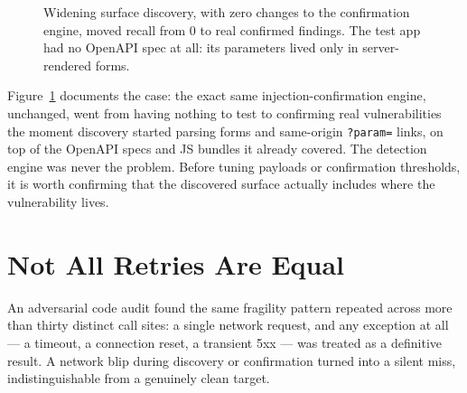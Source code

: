 \documentclass[10pt]{article}
\begin{document}
\begin{figure}[h]
\centering
{}
\caption{Widening surface discovery, with zero changes to the confirmation engine, moved recall from 0 to real confirmed findings. The test app had no OpenAPI spec at all: its parameters lived only in server-rendered forms.}
\label{fig:discovery}
\end{figure}

Figure~\ref{fig:discovery} documents the case: the exact same injection-confirmation engine, unchanged, went from having nothing to test to confirming real vulnerabilities the moment discovery started parsing forms and same-origin \texttt{?param=} links, on top of the OpenAPI specs and JS bundles it already covered. The detection engine was never the problem. Before tuning payloads or confirmation thresholds, it is worth confirming that the discovered surface actually includes where the vulnerability lives.

\section{Not All Retries Are Equal}

An adversarial code audit found the same fragility pattern repeated across more than thirty distinct call sites: a single network request, and any exception at all --- a timeout, a connection reset, a transient 5xx --- was treated as a definitive result. A network blip during discovery or confirmation turned into a silent miss, indistinguishable from a genuinely clean target.
\end{document}
